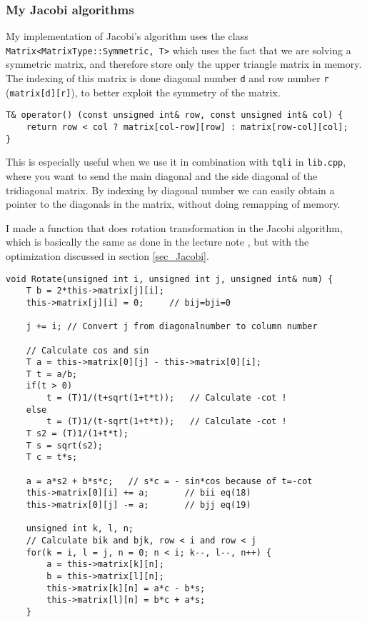 \documentclass[11pt,english,a4paper]{article}
\begin{document}
\begin{flushleft}
\subsubsection{My Jacobi algorithms} \label{sec_my_Jacobi}

My implementation of Jacobi's algorithm uses the class \texttt{Matrix<MatrixType::Symmetric, T>} which uses the fact that we are solving a symmetric matrix, and therefore store only the upper triangle matrix in memory. The indexing of this matrix is done diagonal number \texttt{d} and row number \texttt{r} (\texttt{matrix[d][r]}), to better exploit the symmetry of the matrix. 

\begin{lstlisting}[title={Matrix indexing of \texttt{Matrix<MatrixType::Symmetric, T>}}]
T& operator() (const unsigned int& row, const unsigned int& col) {
	return row < col ? matrix[col-row][row] : matrix[row-col][col];
}
\end{lstlisting}

This is especially useful when we use it in combination with \texttt{tqli} in \texttt{lib.cpp}, where you want to send the main diagonal and the side diagonal of the tridiagonal matrix. By indexing by diagonal number we can easily obtain a pointer to the diagonals in the matrix, without doing remapping of memory.

I made a function that does rotation transformation in the Jacobi algorithm, which is basically the same as done in the lecture note \cite{lecture}, but with the optimization discussed in section \ref{sec_Jacobi}.

\begin{lstlisting}[title={\texttt{Matrix<MatrixType::Symmetric, T>::Rotate}}]
void Rotate(unsigned int i, unsigned int j, unsigned int& num) {
	T b = 2*this->matrix[j][i];
	this->matrix[j][i] = 0;     // bij=bji=0
	
	j += i;	// Convert j from diagonalnumber to column number
	
	// Calculate cos and sin
	T a = this->matrix[0][j] - this->matrix[0][i];
	T t = a/b;
	if(t > 0)
		t = (T)1/(t+sqrt(1+t*t));   // Calculate -cot !
	else
		t = (T)1/(t-sqrt(1+t*t));   // Calculate -cot !
	T s2 = (T)1/(1+t*t);
	T s = sqrt(s2);
	T c = t*s;
	
	a = a*s2 + b*s*c; 	// s*c = - sin*cos because of t=-cot
	this->matrix[0][i] += a;       // bii eq(18)
	this->matrix[0][j] -= a;       // bjj eq(19)
	
	unsigned int k, l, n;
	// Calculate bik and bjk, row < i and row < j
	for(k = i, l = j, n = 0; n < i; k--, l--, n++) {
		a = this->matrix[k][n];
		b = this->matrix[l][n];
		this->matrix[k][n] = a*c - b*s;
		this->matrix[l][n] = b*c + a*s;
	}
         

\end{lstlisting}
\end{flushleft}
\end{document}
